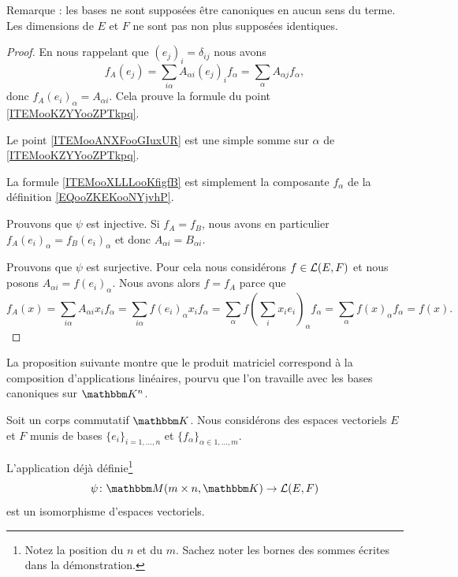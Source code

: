 Remarque : les bases ne sont supposées être canoniques en aucun sens du terme. Les dimensions de \( E\) et \( F\) ne sont pas non plus supposées identiques.

\begin{proof}
    En nous rappelant que \( (e_j)_i=\delta_{ij}\) nous avons
    \begin{equation}        \label{EQooWGZHooIBoygB}
        f_A(e_j)=\sum_{i\alpha}A_{\alpha i}(e_j)_if_{\alpha}=\sum_{\alpha}A_{\alpha j}f_{\alpha},
    \end{equation}
    donc \( f_A(e_i)_{\alpha}=A_{\alpha i}\). Cela prouve la formule du point \ref{ITEMooKZYYooZPTkpq}.

    Le point \ref{ITEMooANXFooGIuxUR} est une simple somme sur \( \alpha\) de \ref{ITEMooKZYYooZPTkpq}.

    La formule \eqref{ITEMooXLLLooKfigfB} est simplement la composante \( f_{\alpha}\) de la définition \ref{EQooZKEKooNYjvhP}.

    Prouvons que \( \psi\) est injective. Si \( f_A=f_B\), nous avons en particulier \( f_A(e_i)_{\alpha}=f_B(e_i)_{\alpha}\) et donc \( A_{\alpha i}=B_{\alpha i}\).

    Prouvons que \( \psi\) est surjective. Pour cela nous considérons \( f\in \mathcal{L}(E,F)\) et nous posons \( A_{\alpha i}=f(e_i)_{\alpha}\). Nous avons alors \( f=f_A\) parce que
    \begin{equation}
        f_A(x)=\sum_{i\alpha}A_{\alpha i}x_if_{\alpha}=\sum_{i\alpha}f(e_i)_{\alpha}x_if_{\alpha}=\sum_{\alpha}f(\sum_ix_ie_i)_{\alpha}f_{\alpha}=\sum_{\alpha}f(x)_{\alpha}f_{\alpha}=f(x).
    \end{equation}
\end{proof}

La proposition suivante montre que le produit matriciel correspond à la composition d'applications linéaires, pourvu que l'on travaille avec les bases canoniques sur \( \eK^n\).
\begin{proposition}      \label{PROPooIYVQooOiuRhX}
    Soit un corps commutatif \( \eK\). Nous considérons des espaces vectoriels \( E\) et \( F\) munis de bases \( \{ e_i \}_{i=1,\ldots, n}\) et \( \{ f_{\alpha}\}_{\alpha\in 1,\ldots, m} \).

    L'application déjà définie\footnote{Notez la position du \( n\) et du \( m\). Sachez noter les bornes des sommes écrites dans la démonstration.}
    \begin{equation}
        \psi\colon \eM(m\times n,\eK)\to \aL(E,F)
    \end{equation}
    est un isomorphisme d'espaces vectoriels.
\end{proposition}

